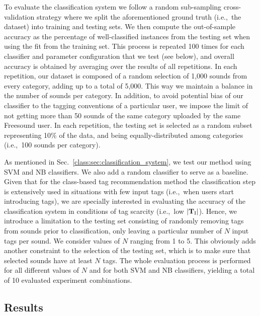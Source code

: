 To evaluate the classification system we follow a random sub-sampling cross-validation strategy where we split the aforementioned ground truth (i.e.,~the dataset) into training and testing sets. We then compute the out-of-sample accuracy as the percentage of well-classified instances from the testing set when using the fit from the training set. This process is repeated 100 times for each classifier and parameter configuration that we test (see below), and overall accuracy is obtained by averaging over the results of all repetitions. In each repetition, our dataset is composed of a random selection of 1,000 sounds from every category, adding up to a total of 5,000. This way we maintain a balance in the number of sounds per category. In addition, to avoid potential bias of our classifier to the tagging conventions of a particular user, we impose the limit of not getting more than 50 sounds of the same category uploaded by the same Freesound user. %
In each repetition, the testing set is selected as a random subset representing 10\% of the data, and being equally-distributed among categories (i.e.,~100 sounds per category). 

As mentioned in Sec.~\ref{class:sec:classification_system}, we test our method using SVM and NB classifiers. We also add a random classifier to serve as a baseline.
Given that for the class-based tag recommendation method the classification step is extensively used in situations with few input tags (i.e.,~when users start introducing tags), we are specially interested in evaluating the accuracy of the classification system in conditions of tag scarcity (i.e.,~low $|\mathbf{T}_{\text{I}}|$).
Hence, we introduce a limitation to the testing set consisting of randomly removing tags from sounds prior to classification, only leaving a particular number of $N$ input tags per sound. We consider values of $N$ ranging from 1 to 5. This obviously adds another constraint to the selection of the testing set, which is to make sure that selected sounds have at least $N$ tags. The whole evaluation process is performed for all different values of $N$ and for both SVM and NB classifiers, yielding a total of 10 evaluated experiment combinations.

\subsection{Results}
\label{class:sec:evaluation_classifier_results}

